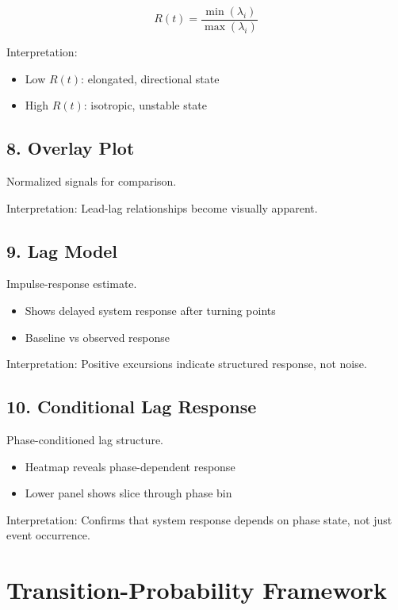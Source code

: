 \documentclass[11pt]{article}
\begin{document}
\begin{equation}
R(t) = \frac{\min(\lambda_i)}{\max(\lambda_i)}
\end{equation}

Interpretation:
\begin{itemize}
\item Low $R(t)$: elongated, directional state
\item High $R(t)$: isotropic, unstable state
\end{itemize}

\subsection{8. Overlay Plot}

Normalized signals for comparison.

Interpretation:
Lead-lag relationships become visually apparent.

\subsection{9. Lag Model}

Impulse-response estimate.

\begin{itemize}
\item Shows delayed system response after turning points
\item Baseline vs observed response
\end{itemize}

Interpretation:
Positive excursions indicate structured response, not noise.

\subsection{10. Conditional Lag Response}

Phase-conditioned lag structure.

\begin{itemize}
\item Heatmap reveals phase-dependent response
\item Lower panel shows slice through phase bin
\end{itemize}

Interpretation:
Confirms that system response depends on phase state, not just event occurrence.

\section{Transition-Probability Framework}
\end{document}
